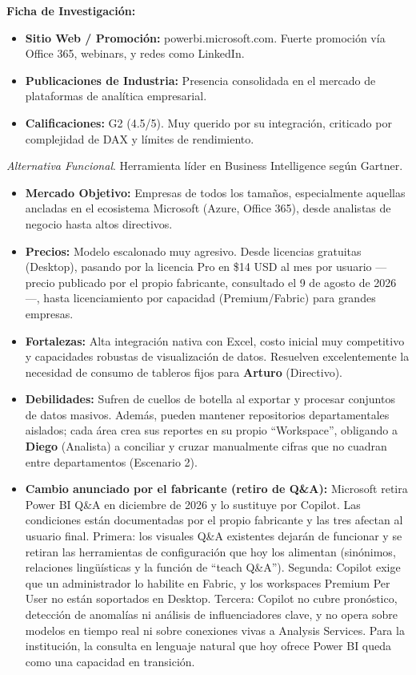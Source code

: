 \textbf{Ficha de Investigación:}
\begin{itemize}
    \item \textbf{Sitio Web / Promoción:} powerbi.microsoft.com. Fuerte promoción vía Office 365, webinars, y redes como LinkedIn.
    \item \textbf{Publicaciones de Industria:} Presencia consolidada en el mercado de plataformas de analítica empresarial.
    \item \textbf{Calificaciones:} G2 (4.5/5). Muy querido por su integración, criticado por complejidad de DAX y límites de rendimiento.
\end{itemize}
\vspace{0.35cm}

\textit{Alternativa Funcional}. Herramienta líder en Business Intelligence según Gartner.
\begin{itemize}
    \item \textbf{Mercado Objetivo:} Empresas de todos los tamaños, especialmente aquellas ancladas en el ecosistema Microsoft (Azure, Office 365), desde analistas de negocio hasta altos directivos.
    \item \textbf{Precios:} Modelo escalonado muy agresivo. Desde licencias gratuitas (Desktop), pasando por la licencia Pro en \$14 USD al mes por usuario —precio publicado por el propio fabricante, consultado el 9 de agosto de 2026—, hasta licenciamiento por capacidad (Premium/Fabric) para grandes empresas.
    \item \textbf{Fortalezas:} Alta integración nativa con Excel, costo inicial muy competitivo y capacidades robustas de visualización de datos. Resuelven excelentemente la necesidad de consumo de tableros fijos para \textbf{Arturo} (Directivo).
    \item \textbf{Debilidades:} Sufren de cuellos de botella al exportar y procesar conjuntos de datos masivos. Además, pueden mantener repositorios departamentales aislados; cada área crea sus reportes en su propio ``Workspace'', obligando a \textbf{Diego} (Analista) a conciliar y cruzar manualmente cifras que no cuadran entre departamentos (Escenario 2).
    \item \textbf{Cambio anunciado por el fabricante (retiro de Q\&A):} Microsoft retira Power BI Q\&A en diciembre de 2026 y lo sustituye por Copilot. Las condiciones están documentadas por el propio fabricante y las tres afectan al usuario final. Primera: los visuales Q\&A existentes dejarán de funcionar y se retiran las herramientas de configuración que hoy los alimentan (sinónimos, relaciones lingüísticas y la función de ``teach Q\&A''). Segunda: Copilot exige que un administrador lo habilite en Fabric, y los workspaces Premium Per User no están soportados en Desktop. Tercera: Copilot no cubre pronóstico, detección de anomalías ni análisis de influenciadores clave, y no opera sobre modelos en tiempo real ni sobre conexiones vivas a Analysis Services. Para la institución, la consulta en lenguaje natural que hoy ofrece Power BI queda como una capacidad en transición.

\end{itemize}
